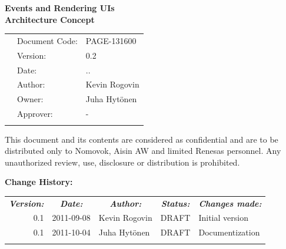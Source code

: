 \documentclass[a4paper,11pt]{article}
\renewcommand{\dateseparator}{.}
\newcommand{\todayiso}{\twodigit\day\dateseparator\twodigit\month\dateseparator\the\year}
\begin{document}
\begin{center}

\vspace*{105.5pt}
{\LARGE \bf Events and Rendering UIs	}\\
{\LARGE \bf Architecture Concept}\\
\vspace{71pt}

{
\begin{tabular}{lll}
  &Document Code: & PAGE-131600 \\ 
  &Version: & 0.2 \\ 
  &Date: & \todayiso \\ 
  &Author: & Kevin Rogovin \\ 
  &Owner: & Juha Hytönen \\ 
  &Approver: & - \\
  \multicolumn{1}{p{3.83cm}}{} &
  \multicolumn{1}{p{4.17cm}}{} & 
  \multicolumn{1}{p{8.00cm}}{}\\
\end{tabular}
}

\small
This document and its contents are considered as confidential and are to be distributed only to Nomovok, Aisin AW and limited Renesas personnel. 
Any unauthorized review, use, disclosure or distribution is prohibited. 

\end{center}

\newpage

\noindent\textbf{Change History:}
\label{sec:changelog}
\begin{table}[h!tbp]
  \begin{tabular}{rllll}
    \multicolumn{1}{c}{\textbf{\textit{Version:}}}& 
    \multicolumn{1}{c}{\textbf{\textit{Date:}}} & 
    \multicolumn{1}{c}{\textbf{\textit{Author:}}} &
    \multicolumn{1}{c}{\textbf{\textit{Status:}}} &
    \multicolumn{1}{c}{\textbf{\textit{Changes made:}}}\\
    0.1 & 2011-09-08 & Kevin Rogovin & DRAFT & Initial version \\
    0.1 & 2011-10-04 & Juha Hytönen & DRAFT & Documentization \\
    \multicolumn{1}{p{1.8cm}}{}&
    \multicolumn{1}{p{2.18cm}}{}&
    \multicolumn{1}{p{3.42cm}}{}&
    \multicolumn{1}{p{2.31cm}}{}&
    \multicolumn{1}{p{6.2cm}}{}\\
  \end{tabular}
\end{table}
\end{document}
